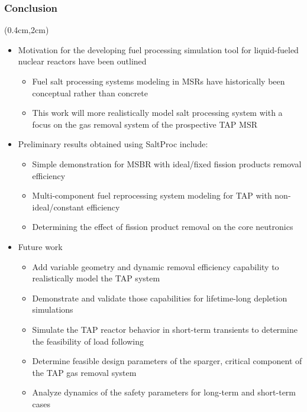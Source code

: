 \begin{frame}
\frametitle{Conclusion}
	\begin{textblock*}{12cm}(0.4cm,2cm) %
	\begin{itemize}
		\item Motivation for the developing fuel processing simulation tool 
		for liquid-fueled nuclear reactors have been outlined
		\begin{itemize}
			\item Fuel salt processing systems modeling in \glspl{MSR} have 
			historically been conceptual rather than concrete
			\item This work will more realistically model salt processing 
			system with a focus
on the gas removal system of the prospective 
			\gls{TAP} \gls{MSR}
		\end{itemize} 
		\item Preliminary results obtained using SaltProc include:
			\begin{itemize}
				\item Simple demonstration for \gls{MSBR} with ideal/fixed 
				fission products removal efficiency
				\item Multi-component fuel reprocessing system modeling 
				for \gls{TAP} with non-ideal/constant efficiency
				\item Determining the effect of fission product removal on the 
				core neutronics
			\end{itemize}
		
		\item Future work
			\begin{itemize}
				\item Add variable geometry and dynamic removal efficiency 
				capability to realistically model the \gls{TAP} system
				\item Demonstrate and validate those capabilities for 
				lifetime-long depletion simulations
				\item Simulate the \gls{TAP} reactor behavior in short-term 
				transients to determine the
feasibility of load following
				\item Determine feasible design parameters of the sparger, 
				critical component of the
TAP gas removal system
				\item Analyze dynamics of the safety parameters for long-term 
				and short-term cases
			\end{itemize}
	\end{itemize}
\end{textblock*}
\end{frame}
